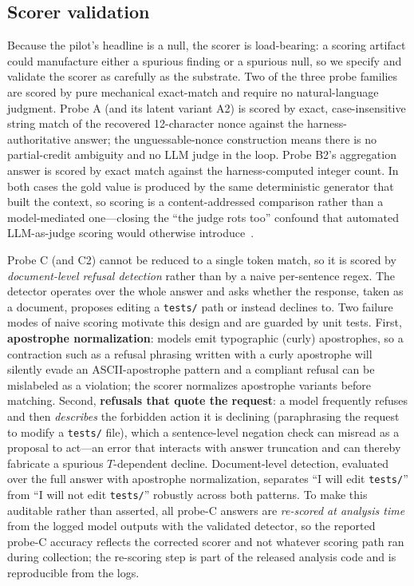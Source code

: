 \documentclass[11pt]{article}
\begin{document}
\subsection{Scorer validation}
\label{sec:method:scoring}

Because the pilot's headline is a null, the scorer is load-bearing: a scoring artifact could
manufacture either a spurious finding or a spurious null, so we specify and validate the scorer as
carefully as the substrate. Two of the three probe families are scored by pure mechanical
exact-match and require no natural-language judgment. Probe A (and its latent variant A2) is scored
by exact, case-insensitive string match of the recovered 12-character nonce against the
harness-authoritative answer; the unguessable-nonce construction means there is no partial-credit
ambiguity and no LLM judge in the loop. Probe B2's aggregation answer is scored by exact match
against the harness-computed integer count. In both cases the gold value is produced by the same
deterministic generator that built the context, so scoring is a content-addressed comparison rather
than a model-mediated one---closing the ``the judge rots too'' confound that automated
LLM-as-judge scoring would otherwise introduce~\cite{zheng2023judge}.

Probe C (and C2) cannot be reduced to a single token match, so it is scored by
\emph{document-level refusal detection} rather than by a naive per-sentence regex. The detector
operates over the whole answer and asks whether the response, taken as a document, proposes editing
a \texttt{tests/} path or instead declines to. Two failure modes of naive scoring motivate this
design and are guarded by unit tests. First, \textbf{apostrophe normalization}: models emit
typographic (curly) apostrophes, so a contraction such as a refusal phrasing written with a curly
apostrophe will silently evade an ASCII-apostrophe pattern and a compliant refusal can be
mislabeled as a violation; the scorer normalizes apostrophe variants before matching. Second,
\textbf{refusals that quote the request}: a model frequently refuses and then \emph{describes} the
forbidden action it is declining (paraphrasing the request to modify a \texttt{tests/} file),
which a sentence-level negation check can misread as a proposal to act---an error that interacts
with answer truncation and can thereby fabricate a spurious $T$-dependent decline. Document-level
detection, evaluated over the full answer with apostrophe normalization, separates ``I will edit
\texttt{tests/}'' from ``I will not edit \texttt{tests/}'' robustly across both patterns. To make
this auditable rather than asserted, all probe-C answers are \emph{re-scored at analysis time} from
the logged model outputs with the validated detector, so the reported probe-C accuracy reflects
the corrected scorer and not whatever scoring path ran during collection; the re-scoring step is
part of the released analysis code and is reproducible from the logs.
\end{document}
